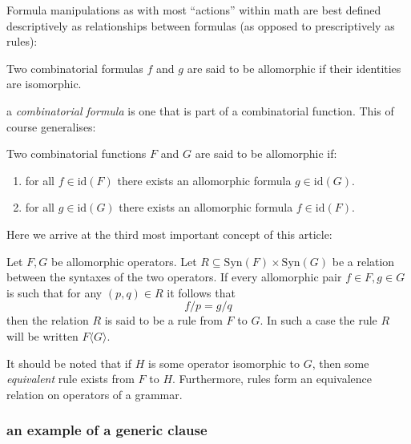 \documentclass[twoside]{article}
\newenvironment{definition}[1][Definition]{\begin{trivlist}
\item[\hskip \labelsep {\bfseries #1}]}{\end{trivlist}}
\begin{document}
Formula manipulations as with most ``actions'' within math are best defined descriptively as relationships between formulas
(as opposed to prescriptively as rules):

\begin{definition}[Formula Allomorphism]

Two combinatorial formulas $ f $ and $ g $ are said to be allomorphic if their identities are isomorphic.

\end{definition}
a \emph{combinatorial formula} is one that is part of a combinatorial function.  This of course generalises:

\begin{definition}[Operator Allomorphism]

Two combinatorial functions $ F $ and $ G $ are said to be allomorphic if:

\begin{enumerate}

\item for all $ f\in\mbox{id}(F) $ there exists an allomorphic formula $ g\in\mbox{id}(G) $.
\item for all $ g\in\mbox{id}(G) $ there exists an allomorphic formula $ f\in\mbox{id}(F) $.

\end{enumerate}

\end{definition}
Here we arrive at the third most important concept of this article:

\begin{definition}[Rule]

Let $ F, G $ be allomorphic operators.  Let $ R\subseteq\mbox{Syn}(F)\times\mbox{Syn}(G) $ be a relation between the
syntaxes of the two operators.
If every allomorphic pair $ f\in F, g\in G $ is such that for any $ (p, q)\in R $ it follows that
$$ f/p=g/q $$
then the relation $ R $ is said to be a rule from $ F $ to $ G $.  In such a case the rule $ R $ will be written
$ F\langle G\rangle $.

\end{definition}
It should be noted that if $ H $ is some operator isomorphic to $ G $, then some \emph{equivalent} rule
exists from $ F $ to $ H $.  Furthermore, rules form an equivalence relation on operators of a grammar.

\subsubsection{an example of a generic clause}
\end{document}
